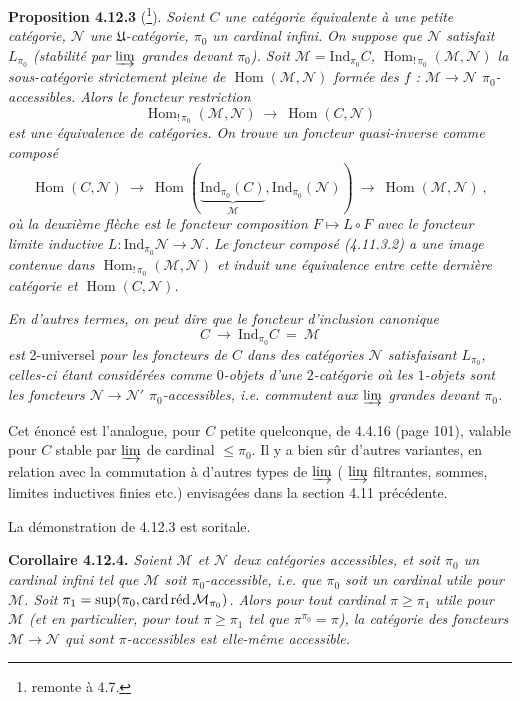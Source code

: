 \documentclass[11pt]{article}
\newcommand{\printedpage}[1]{\marginpar{\footnotesize p.~#1}}
\newcommand{\msp}[1]{\marginpar{\footnotesize [#1]}}
\newcommand{\Ind}{\mathrm{Ind}}
\newcommand{\card}{\operatorname{card}}
\newcommand{\Hom}{\operatorname{Hom}}
\newcommand{\M}{\mathcal{M}}
\newcommand{\N}{\mathcal{N}}
\newcommand{\red}{\mathop{\textup{réd}}\nolimits}
\begin{document}
\textbf{Proposition 4.12.3} (\footnote{remonte à 4.7.}). \textit{Soient $C$ une catégorie équivalente à une petite catégorie, $\mathcal{N}$ une $\mathfrak{U}$-catégorie, $\pi_0$ un cardinal infini.} \msp{page 276} \textit{On suppose que $\mathcal{N}$ satisfait $L_{\pi_0}$ (stabilité par $\varinjlim$ grandes devant $\pi_0$). Soit $\mathcal{M} = \Ind_{\pi_0} C$, $\Hom_{!\,\pi_0}(\mathcal{M},\mathcal{N})$ la sous-catégorie strictement pleine de $\Hom(\mathcal{M},\mathcal{N})$ formée des $f$ : $\mathcal{M} \longrightarrow \mathcal{N}$ $\pi_0$-accessibles. Alors le foncteur restriction}
\[
\Hom_{!\,\pi_0}(\mathcal{M},\mathcal{N}) \ \longrightarrow \ \Hom(C,\mathcal{N}) \tag*{(4.12.3.1)}
\]
\textit{est une équivalence de catégories. On trouve un foncteur quasi-inverse comme composé}
\[
\Hom(C,\mathcal{N}) \ \longrightarrow \ \Hom(\underbrace{\Ind_{\pi_0}(C)}_{\mathcal{M}},\Ind_{\pi_0}(\mathcal{N})) \ \longrightarrow \ \Hom(\mathcal{M},\mathcal{N}) \ , \tag*{(4.12.3.2)}
\]
\textit{où la deuxième flèche est le foncteur composition $F \longmapsto L \circ F$ avec le foncteur limite inductive $L : \Ind_{\pi_0}\mathcal{N} \longrightarrow \mathcal{N}$. Le foncteur composé (4.11.3.2) a une image contenue dans $\Hom_{!\,\pi_0}(\mathcal{M},\mathcal{N})$ et induit une équivalence entre cette dernière catégorie et $\Hom(C,\mathcal{N})$.} %

\msp{page 277}

\textit{En d'autres termes, on peut dire que le foncteur d'inclusion canonique}
\[
C \ \longrightarrow \ \Ind_{\pi_0} C \ = \ \mathcal{M}
\]
\textit{est} 2-universel \textit{pour les foncteurs de $C$ dans des catégories $\mathcal{N}$ satisfaisant $L_{\pi_0}$, celles-ci étant considérées comme $0$-objets d'une $2$-catégorie où les $1$-objets sont les foncteurs $\mathcal{N} \longrightarrow \mathcal{N}'$ $\pi_0$-accessibles, i.e. commutent aux $\varinjlim$ grandes devant $\pi_0$.}

Cet énoncé est l'analogue, pour $C$ petite quelconque, de 4.4.16 (page 101), valable pour $C$ stable par $\varinjlim$ de cardinal $\leqslant \pi_0$. Il y a bien sûr d'autres variantes, en relation avec la commutation à d'autres types de $\varinjlim$ ( $\varinjlim$ filtrantes, sommes, limites inductives finies etc.) envisagées dans la section 4.11 précédente.

La démonstration de 4.12.3 est soritale.

\printedpage{104}
\msp{page 278}
\textbf{Corollaire 4.12.4.} \textit{Soient $\M$ et $\N$ deux catégories accessibles, et soit $\pi_0$ un cardinal infini tel que $\M$ soit $\pi_0$-accessible, i.e. que $\pi_0$ soit un cardinal utile pour $\M$. Soit $\pi_1 = \sup(\pi_0,\allowbreak \card\red\M_{\pi_0})$. Alors pour tout cardinal $\pi \geqslant \pi_1$ utile pour $\M$ (et en particulier, pour tout $\pi \geqslant \pi_1$ tel que $\pi^{\pi_0} = \pi$), la catégorie des foncteurs $\M \longrightarrow \N$ qui sont $\pi$-accessibles est elle-même accessible.}
\end{document}
